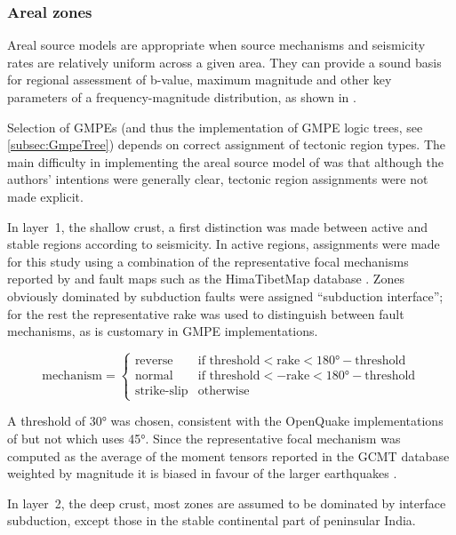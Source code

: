 \documentclass{article}
\begin{document}
\subsubsection{Areal zones}
\label{subsubsec:Areal}

Areal source models are appropriate when source mechanisms and seismicity rates are relatively uniform across a given area.
They can provide a sound basis for regional assessment of b-value, maximum magnitude and other key parameters of a frequency-magnitude distribution, as shown in \cite{thingbaijam2011seismogenic}.

Selection of GMPEs (and thus the implementation of GMPE logic trees, see \autoref{subsec:GmpeTree}) depends on correct assignment of tectonic region types.
The main difficulty in implementing the areal source model of \cite{nath2012probabilistic} was that although the authors' intentions were generally clear, tectonic region assignments were not made explicit.

In layer~1, the shallow crust, a first distinction was made between active and stable regions according to seismicity.
In active regions, assignments were made for this study using a combination of the representative focal mechanisms reported by \cite{nath2012probabilistic} and fault maps such as the HimaTibetMap database \citep{styron2010database}.
Zones obviously dominated by subduction faults were assigned ``subduction interface''; for the rest the representative rake was used to distinguish between fault mechanisms, as is customary in GMPE implementations.

$$
\text{mechanism} = 
\begin{cases}
\text{reverse} & 
\text{if threshold} < \text{rake} < 180° - \text{threshold} \\
\text{normal} & 
\text{if threshold} < -\text{rake} < 180° - \text{threshold} \\
\text{strike-slip} & 
\text{otherwise}
\end{cases}
$$

A threshold of 30° was chosen, consistent with the OpenQuake implementations of \cite{boore2008ground, campbell2008nga, sharma2009ground} but not \cite{zhao2006attenuation} which uses 45°.
Since the representative focal mechanism was computed as the average of the moment tensors reported in the GCMT database weighted by magnitude it is biased in favour of the larger earthquakes \citep{thingbaijam2011seismogenic}.

In layer~2, the deep crust, most zones are assumed to be dominated by interface subduction, except those in the stable continental part of peninsular India.
\end{document}
